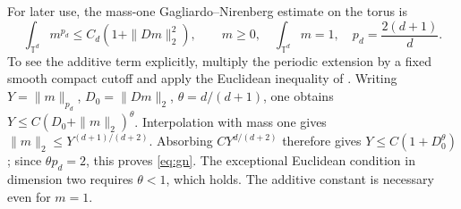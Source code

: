 \documentclass[11pt]{article}
\newcommand{\T}{\mathbb T}
\numberwithin{equation}{section}
\begin{document}
For later use, the mass-one Gagliardo--Nirenberg estimate on the torus is
\begin{equation}\label{eq:gn}
 \int_{\T^d}m^{p_d}\le C_d(1+\|Dm\|_2^2),
 \qquad m\ge0,\quad\int_{\T^d}m=1,\quad
 p_d=\frac{2(d+1)}d .
\end{equation}
To see the additive term explicitly, multiply the periodic extension by
a fixed smooth compact cutoff and apply the Euclidean inequality
of \cite[Lecture~II, (2.2)--(2.3), pp.~125--126]{Nirenberg}.
Writing \(Y=\|m\|_{p_d}\), \(D_0=\|Dm\|_2\),
\(\theta=d/(d+1)\), one obtains
\(Y\le C(D_0+\|m\|_2)^\theta\).
Interpolation with mass one gives
\(\|m\|_2\le Y^{(d+1)/(d+2)}\).
Absorbing \(CY^{d/(d+2)}\) therefore gives
\(Y\le C(1+D_0^\theta)\); since \(\theta p_d=2\), this proves
\eqref{eq:gn}. The exceptional Euclidean condition in dimension two
requires \(\theta<1\), which holds. The additive constant is necessary
even for \(m=1\).
\end{document}
